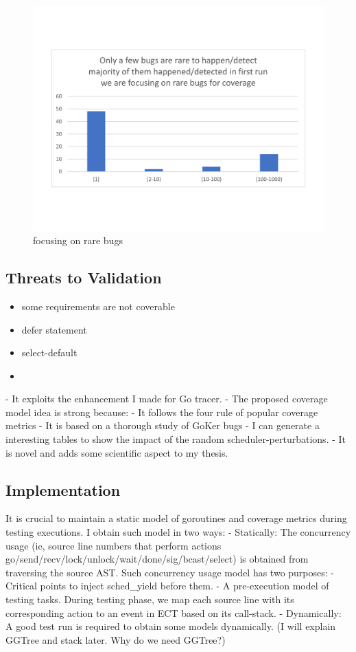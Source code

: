 \begin{figure}
\centering
  \includegraphics[width=.95\linewidth]{figs/coverage_motivation_tentative.pdf}
  \caption{focusing on rare bugs}
  \label{fig:rare_bugs}
\end{figure}



\subsection{Threats to Validation}
\begin{itemize}
  \item some requirements are not coverable
  \item defer statement
  \item select-default
  \item
\end{itemize}


- It exploits the enhancement I made for Go tracer.
- The proposed coverage model idea is strong because:
- It follows the four rule of popular coverage metrics
- It is based on a thorough study of GoKer bugs
- I can generate a interesting tables to show the impact of the random scheduler-perturbations.
- It is novel and adds some scientific aspect to my thesis.

\subsection{Implementation}
It is crucial to maintain a static model of goroutines and coverage metrics during testing executions. I obtain such model in two ways:
-	Statically: The concurrency usage (ie, source line numbers that perform actions go/send/recv/lock/unlock/wait/done/sig/bcast/select) is obtained from traversing the source AST. Such concurrency usage model has two purposes:
- Critical points to inject sched\_yield before them.
- A pre-execution model of testing tasks. During testing phase, we map each source line with its corresponding action to an event in ECT based on its call-stack.
-	Dynamically: A good test run is required to obtain some models dynamically. (I will explain GGTree and stack later. Why do we need GGTree?)


